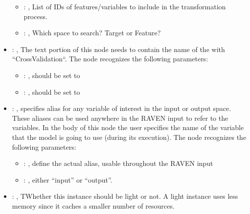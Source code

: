 \begin{itemize}
\begin{itemize}
        \item {}: , 
          List of IDs of features/variables to include in the transformation process.

        \item {}: , 
          Which space to search? Target or Feature?
      \end{itemize}

    \item {}: , 
      The text portion of this node needs to contain the name of the  with
               ``CrossValidation``.
      The  node recognizes the following parameters:
        \begin{itemize}
          \item {}: , 
            should be set to 
          \item {}: , 
            should be set to 
      \end{itemize}

    \item {}: , 
      specifies alias for         any variable of interest in the input or output space. These
      aliases can be used anywhere in the RAVEN input to         refer to the variables. In the body
      of this node the user specifies the name of the variable that the model is going to use
      (during its execution).
      The  node recognizes the following parameters:
        \begin{itemize}
          \item {}: , 
            define the actual alias, usable throughout the RAVEN input
          \item {}: , 
            either ``input'' or ``output''.
      \end{itemize}

    \item {}: , 
      TWhether this instance should be light or not. A light instance uses
      less memory since it caches a smaller number of resources.


\end{itemize}
